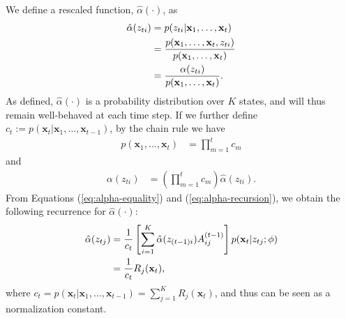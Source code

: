 \documentclass{article}
\begin{document}
We define a rescaled function, $\hat{\alpha}(\cdot)$, as
\begin{align}
    \hat{\alpha}(z_{ti}) &= p(z_{ti} | \mathbf{x}_1,\ldots,\mathbf{x}_t) \notag{}\\
            &= \frac{p(\mathbf{x}_1,\ldots,\mathbf{x}_t, z_{ti})}{p(\mathbf{x}_1,\ldots,\mathbf{x}_t)} \notag{}\\
            &= \frac{\alpha(z_{ti})}{p(\mathbf{x}_1,\ldots,\mathbf{x}_t)}.
\end{align}
As defined, $\hat{\alpha}(\cdot)$ is a probability distribution over $K$ states, and will thus remain well-behaved at each time step. If we further define $c_{t} := p(\mathbf{x}_t|\mathbf{x}_1, \ldots, \mathbf{x}_{t-1})$, by the chain rule we have
\begin{align*}
    p(\mathbf{x}_1, \ldots, \mathbf{x}_{t}) &= \prod_{m=1}^{t}c_m
\end{align*}
and
\begin{align}\label{eq:alpha-equality}
    \alpha(z_{ti}) &= \left(\prod_{m=1}^{t}c_m\right)\hat{\alpha}(z_{ti}).
\end{align}
From Equations (\ref{eq:alpha-equality}) and (\ref{eq:alpha-recursion}), we obtain the following recurrence for $\hat{\alpha}(\cdot)$:
\begin{align}
    \hat{\alpha}(z_{tj}) &= \frac{1}{c_t}\left[\sum_{i=1}^{K} \hat{\alpha}(z_{(t-1)i})A_{ij}^{(t-1)}\right]p(\mathbf{x}_t| z_{tj}; \phi) \notag{}\\
                         &= \frac{1}{c_t}R_j(\mathbf{x}_t),
\end{align}
where $c_t = p(\mathbf{x}_t|\mathbf{x}_1, \ldots, \mathbf{x}_{t-1}) = \sum_{j=1}^{K}R_j(\mathbf{x}_t)$, and thus can be seen as a normalization constant.
\end{document}
